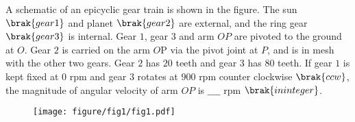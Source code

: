 
\iffalse
    \title{Assignment}
    \author{EE24BTECH11028}
    \section{ME}
    \chapter{2022}
  \fi
     \item A schematic of an epicyclic gear train is shown in the figure. The sun $\brak{gear 1}$ and planet $\brak{gear 2}$ are external, and the ring gear $\brak{gear 3}$ is internal. Gear $1$, gear $3$ and arm $OP$ are pivoted to the ground at $O$. Gear $2$ is carried on the arm $O$P via the pivot joint at $P$, and is in mesh with the other two gears. Gear $2$ has $20$ teeth and gear $3$ has $80$ teeth. If gear $1$ is kept fixed at $0$ rpm and gear $3$ rotates at $900$ rpm counter clockwise $\brak{ccw}$, the magnitude of angular velocity of arm $OP$ is   $\_\_\_\_$ rpm $\brak{in integer}$.
     
\begin{figure}[h!]
         \centering
        \texttt{[image: figure/fig1/fig1.pdf]}
		\caption{}
        \label{stemplot}

\end{figure}

